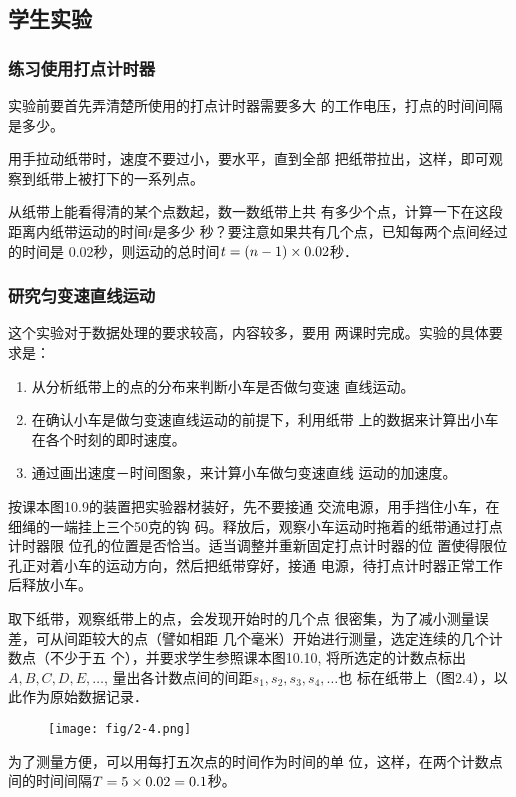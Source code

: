 \subsection{学生实验}
\subsubsection{练习使用打点计时器}
实验前要首先弄清楚所使用的打点计时器需要多大
的工作电压，打点的时间间隔是多少。

用手拉动纸带时，速度不要过小，要水平，直到全部
把纸带拉出，这样，即可观察到纸带上被打下的一系列点。

从纸带上能看得清的某个点数起，数一数纸带上共
有多少个点，计算一下在这段距离内纸带运动的时间$t$是多少
秒？要注意如果共有几个点，已知每两个点间经过的时间是
0.02秒，则运动的总时间$t=(n-1)\times0.02$秒．


\subsubsection{研究匀变速直线运动}
这个实验对于数据处理的要求较高，内容较多，要用
两课时完成。实验的具体要求是：
\begin{enumerate}
\item 从分析纸带上的点的分布来判断小车是否做匀变速
直线运动。
\item 在确认小车是做匀变速直线运动的前提下，利用纸带
上的数据来计算出小车在各个时刻的即时速度。
\item 通过画出速度－时间图象，来计算小车做匀变速直线
运动的加速度。
\end{enumerate}

按课本图10.9的装置把实验器材装好，先不要接通
交流电源，用手挡住小车，在细绳的一端挂上三个50克的钩
码。释放后，观察小车运动时拖着的纸带通过打点计时器限
位孔的位置是否恰当。适当调整并重新固定打点计时器的位
置使得限位孔正对着小车的运动方向，然后把纸带穿好，接通
电源，待打点计时器正常工作后释放小车。

取下纸带，观察纸带上的点，会发现开始时的几个点
很密集，为了减小测量误差，可从间距较大的点（譬如相距
几个毫米）开始进行测量，选定连续的几个计数点（不少于五
个），并要求学生参照课本图10.10, 将所选定的计数点标出
$A,B,C,D,E,\ldots$, 量出各计数点间的间距$s_1,s_2,s_3,s_4,\ldots$也
标在纸带上（图2.4），以此作为原始数据记录．
\begin{figure}[htp]
    \centering
    \texttt{[image: fig/2-4.png]}
    \caption{}
\end{figure}

为了测量方便，可以用每打五次点的时间作为时间的单
位，这样，在两个计数点间的时间间隔$T=5\times0.02=0.1$秒。

